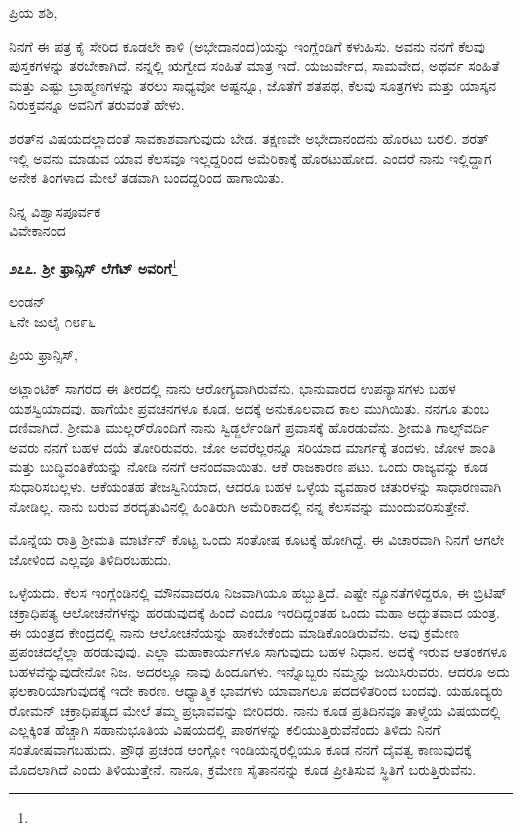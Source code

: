\noindent
ಪ್ರಿಯ ಶಶಿ,

ನಿನಗೆ ಈ ಪತ್ರ ಕೈ ಸೇರಿದ ಕೂಡಲೇ ಕಾಳಿ (ಅಭೇದಾನಂದ)ಯನ್ನು ಇಂಗ್ಲೆಂಡಿಗೆ ಕಳುಹಿಸು. ಅವನು ನನಗೆ ಕೆಲವು ಪುಸ್ತಕಗಳನ್ನು ತರಬೇಕಾಗಿದೆ. ನನ್ನಲ್ಲಿ ಋಗ್ವೇದ ಸಂಹಿತೆ ಮಾತ್ರ ಇದೆ. ಯಜುರ್ವೇದ, ಸಾಮವೇದ, ಅಥರ್ವ ಸಂಹಿತೆ ಮತ್ತು ಎಷ್ಟು ಬ್ರಾಹ್ಮಣಗಳನ್ನು ತರಲು ಸಾಧ್ಯವೋ ಅಷ್ಟನ್ನೂ, ಜೊತೆಗೆ ಶತಪಥ, ಕೆಲವು ಸೂತ್ರಗಳು ಮತ್ತು ಯಾಸ್ಕನ ನಿರುಕ್ತವನ್ನೂ ಅವನಿಗೆ ತರುವಂತೆ ಹೇಳು.

ಶರತ್‌ನ ವಿಷಯದಲ್ಲಾದಂತೆ ಸಾವಕಾಶವಾಗುವುದು ಬೇಡ. ತಕ್ಷಣವೇ ಅಭೇದಾನಂದನು ಹೊರಟು ಬರಲಿ. ಶರತ್ ಇಲ್ಲಿ ಅವನು ಮಾಡುವ ಯಾವ ಕೆಲಸವೂ ಇಲ್ಲದ್ದರಿಂದ ಅಮೆರಿಕಾಕ್ಕೆ ಹೊರಟುಹೋದ. ಎಂದರೆ ನಾನು ಇಲ್ಲಿದ್ದಾಗ ಅನೇಕ ತಿಂಗಳಾದ ಮೇಲೆ ತಡವಾಗಿ ಬಂದದ್ದರಿಂದ ಹಾಗಾಯಿತು.
\vspace{-0.4cm}

{\flushright
ನಿನ್ನ ವಿಶ್ವಾಸಪೂರ್ವಕ\\ವಿವೇಕಾನಂದ\par}

\begin{center}
\textbf{೨೭೭. ಶ‍್ರೀ ಫ್ರಾನ್ಸಿಸ್ ಲೆಗೆಟ್ ಅವರಿಗೆ}\footnote{}
\end{center}
\vspace{-0.4cm}

\begin{flushright}
ಲಂಡನ್\\೬ನೇ ಜುಲೈ ೧೮೯೬
\end{flushright}
\vspace{-0.3cm}

\noindent
ಪ್ರಿಯ ಫ್ರಾನ್ಸಿಸ್,

ಅಟ್ಲಾಂಟಿಕ್ ಸಾಗರದ ಈ ತೀರದಲ್ಲಿ ನಾನು ಆರೋಗ್ಯವಾಗಿರುವೆನು. ಭಾನುವಾರದ ಉಪನ್ಯಾಸಗಳು ಬಹಳ ಯಶಸ್ವಿಯಾದವು. ಹಾಗೆಯೇ ಪ್ರವಚನಗಳೂ ಕೂಡ. ಅದಕ್ಕೆ ಅನುಕೂಲವಾದ ಕಾಲ ಮುಗಿಯಿತು. ನನಗೂ ತುಂಬ ದಣಿವಾಗಿದೆ. ಶ‍್ರೀಮತಿ ಮುಲ್ಲರ್‌ರೊಂದಿಗೆ ನಾನು ಸ್ವಿಡ್ಜರ್ಲೆಂಡಿಗೆ ಪ್ರವಾಸಕ್ಕೆ ಹೊರಡುವೆನು. ಶ‍್ರೀಮತಿ ಗಾಲ್ಸ್‌ವರ್ದಿ ಅವರು ನನಗೆ ಬಹಳ ದಯೆ ತೋರಿರುವರು. ಜೋ\enginline{-} ಅವರೆಲ್ಲರನ್ನೂ ಸರಿಯಾದ ಮಾರ್ಗಕ್ಕೆ ತಂದಳು. ಜೋ\enginline{-}ಳ ಶಾಂತಿ ಮತ್ತು ಬುದ್ಧಿವಂತಿಕೆಯನ್ನು ನೋಡಿ ನನಗೆ ಆನಂದವಾಯಿತು. ಆಕೆ ರಾಜಕಾರಣ ಪಟು. ಒಂದು ರಾಜ್ಯವನ್ನು ಕೂಡ ಸುಧಾರಿಸಬಲ್ಲಳು. ಆಕೆಯಂತಹ ತೇಜಸ್ವಿನಿಯಾದ, ಆದರೂ ಬಹಳ ಒಳ್ಳೆಯ ವ್ಯವಹಾರ ಚತುರಳನ್ನು ಸಾಧಾರಣವಾಗಿ ನೋಡಿಲ್ಲ. ನಾನು ಬರುವ ಶರದೃತುವಿನಲ್ಲಿ ಹಿಂತಿರುಗಿ ಅಮೆರಿಕಾದಲ್ಲಿ ನನ್ನ ಕೆಲಸವನ್ನು ಮುಂದುವರಿಸುತ್ತೇನೆ.

ಮೊನ್ನೆಯ ರಾತ್ರಿ ಶ‍್ರೀಮತಿ ಮಾರ್ಟೆನ್ ಕೊಟ್ಟ ಒಂದು ಸಂತೋಷ ಕೂಟಕ್ಕೆ ಹೋಗಿದ್ದೆ. ಈ ವಿಚಾರವಾಗಿ ನಿನಗೆ ಆಗಲೇ ಜೋಳಿಂದ ಎಲ್ಲವೂ ತಿಳಿದಿರಬಹುದು.

\vspace{0.2cm}

ಒಳ್ಳೆಯದು. ಕೆಲಸ ಇಂಗ್ಲೆಂಡಿನಲ್ಲಿ ಮೌನವಾದರೂ ನಿಜವಾಗಿಯೂ ಹಬ್ಬುತ್ತಿದೆ. ಎಷ್ಟೇ ನ್ಯೂನತೆಗಳಿದ್ದರೂ, ಈ ಬ್ರಿಟಿಷ್ ಚಕ್ರಾಧಿಪತ್ಯ ಆಲೋಚನೆಗಳನ್ನು ಹರಡುವುದಕ್ಕೆ ಹಿಂದೆ ಎಂದೂ ಇರದಿದ್ದಂತಹ ಒಂದು ಮಹಾ ಅದ್ಭುತವಾದ ಯಂತ್ರ. ಈ ಯಂತ್ರದ ಕೇಂದ್ರದಲ್ಲಿ ನಾನು ಆಲೋಚನೆಯನ್ನು ಹಾಕಬೇಕೆಂದು ಮಾಡಿಕೊಂಡಿರುವೆನು. ಅವು ಕ್ರಮೇಣ ಪ್ರಪಂಚದಲ್ಲೆಲ್ಲಾ ಹರಡುವುವು. ಎಲ್ಲಾ ಮಹಾಕಾರ್ಯಗಳೂ ಸಾಗುವುದು ಬಹಳ ನಿಧಾನ. ಅದಕ್ಕೆ ಇರುವ ಆತಂಕಗಳೂ ಬಹಳವೆನ್ನುವುದೇನೋ ನಿಜ. ಅದರಲ್ಲೂ ನಾವು ಹಿಂದೂಗಳು. ಇನ್ನೊಬ್ಬರು ನಮ್ಮನ್ನು ಜಯಿಸಿರುವರು. ಆದರೂ ಅದು ಫಲಕಾರಿಯಾಗುವುದಕ್ಕೆ ಇದೇ ಕಾರಣ. ಆಧ್ಯಾತ್ಮಿಕ ಭಾವಗಳು ಯಾವಾಗಲೂ ಪದದಳಿತರಿಂದ ಬಂದವು. ಯಹೂದ್ಯರು ರೋಮನ್ ಚಕ್ರಾಧಿಪತ್ಯದ ಮೇಲೆ ತಮ್ಮ ಪ್ರಭಾವವನ್ನು ಬೀರಿದರು. ನಾನು ಕೂಡ ಪ್ರತಿದಿನವೂ ತಾಳ್ಮೆಯ ವಿಷಯದಲ್ಲಿ ಎಲ್ಲಕ್ಕಿಂತ ಹೆಚ್ಚಾಗಿ ಸಹಾನುಭೂತಿಯ ವಿಷಯದಲ್ಲಿ ಪಾಠಗಳನ್ನು ಕಲಿಯುತ್ತಿರುವೆನೆಂದು ತಿಳಿದು ನಿನಗೆ ಸಂತೋಷವಾಗಬಹುದು. ಪ್ರೌಢ ಪ್ರಚಂಡ ಆಂಗ್ಲೋ ಇಂಡಿಯನ್ನರಲ್ಲಿಯೂ ಕೂಡ ನನಗೆ ದೈವತ್ವ ಕಾಣುವುದಕ್ಕೆ ಮೊದಲಾಗಿದೆ ಎಂದು ತಿಳಿಯುತ್ತೇನೆ. ನಾನೂ, ಕ್ರಮೇಣ ಸೈತಾನನನ್ನು ಕೂಡ ಪ್ರೀತಿಸುವ ಸ್ಥಿತಿಗೆ ಬರುತ್ತಿರುವೆನು.

